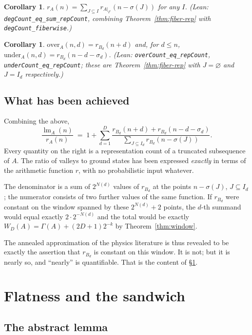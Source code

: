 \documentclass[11pt,a4paper]{article}
\theoremstyle{plain}
\newtheorem{corollary}[theorem]{Corollary}
\theoremstyle{definition}
\theoremstyle{remark}
\DeclareMathOperator{\lm}{lm}
\newcommand{\ovr}{\mathrm{over}}
\newcommand{\undr}{\mathrm{under}}
\newcommand{\Lean}[1]{\texttt{#1}}
\begin{document}
\begin{corollary}\label{cor:deg-rep}
$r_A(n)=\sum_{J\subseteq I}r_{A|_{I^{c}}}(n-\sigma(J))$ for any $I$.
\textup{(Lean: \Lean{degCount\_eq\_sum\_repCount}, combining
Theorem~\ref{thm:fiber-rep} with \Lean{degCount\_fiberwise}.)}
\end{corollary}

\begin{corollary}\label{cor:strata-rep}
$\ovr_A(n,d)=r_{B_d}(n+d)$ and, for $d\le n$,
$\undr_A(n,d)=r_{B_d}(n-d-\sigma_d)$.
\textup{(Lean: \Lean{overCount\_eq\_repCount},
\Lean{underCount\_eq\_repCount}; these are Theorem~\ref{thm:fiber-rep} with
$J=\varnothing$ and $J=I_d$ respectively.)}
\end{corollary}

\subsection{What has been achieved}\label{sec:achieved}

Combining the above,
\[
  \frac{\lm_A(n)}{r_A(n)}
  \;=\;1+\sum_{d=1}^{D}
  \frac{r_{B_d}(n+d)+r_{B_d}(n-d-\sigma_d)}
       {\sum_{J\subseteq I_d}r_{B_d}(n-\sigma(J))}.
\]
Every quantity on the right is a representation count of a truncated
subsequence of $A$. The ratio of valleys to ground states has been expressed
\emph{exactly} in terms of the arithmetic function $r$, with no probabilistic
input whatever.

The denominator is a sum of $2^{N(d)}$ values of $r_{B_d}$ at the points
$n-\sigma(J)$, $J\subseteq I_d$; the numerator consists of two further values of
the same function. If $r_{B_d}$ were constant on the window spanned by these
$2^{N(d)}+2$ points, the $d$-th summand would equal exactly $2\cdot2^{-N(d)}$
and the total would be exactly $W_D(A)=\Gamma(A)+(2D+1)2^{-k}$ by
Theorem~\ref{thm:window}.

The annealed approximation of the physics literature is thus revealed to be
exactly the assertion that $r_{B_d}$ is constant on this window. It is not; but
it is nearly so, and ``nearly'' is quantifiable. That is the content of
\S\ref{sec:sandwich}.

\section{Flatness and the sandwich}\label{sec:sandwich}

\subsection{The abstract lemma}
\end{document}
